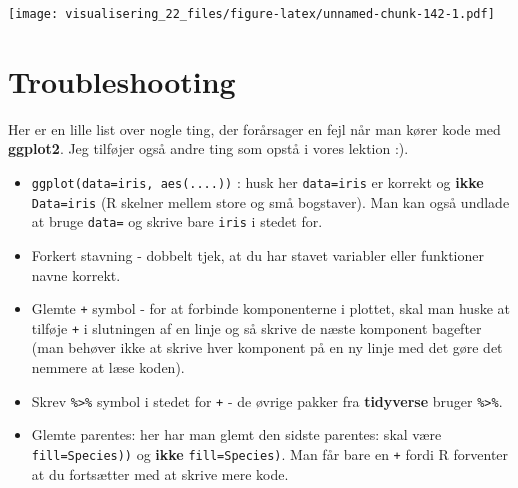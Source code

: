 \documentclass[
]{book}
\newenvironment{Shaded}{\begin{snugshade}}{\end{snugshade}}
\newcommand{\AttributeTok}[1]{\textcolor[rgb]{0.77,0.63,0.00}{#1}}
\newcommand{\DecValTok}[1]{\textcolor[rgb]{0.00,0.00,0.81}{#1}}
\newcommand{\FloatTok}[1]{\textcolor[rgb]{0.00,0.00,0.81}{#1}}
\newcommand{\FunctionTok}[1]{\textcolor[rgb]{0.00,0.00,0.00}{#1}}
\newcommand{\NormalTok}[1]{#1}
\newcommand{\OtherTok}[1]{\textcolor[rgb]{0.56,0.35,0.01}{#1}}
\newcommand{\SpecialCharTok}[1]{\textcolor[rgb]{0.00,0.00,0.00}{#1}}
\newcommand{\StringTok}[1]{\textcolor[rgb]{0.31,0.60,0.02}{#1}}
\begin{document}
\begin{Shaded}
\end{Shaded}

\texttt{[image: visualisering\_22\_files/figure-latex/unnamed-chunk-142-1.pdf]}

\hypertarget{troubleshooting}{%
\section{Troubleshooting}\label{troubleshooting}}

Her er en lille list over nogle ting, der forårsager en fejl når man kører kode med \textbf{ggplot2}. Jeg tilføjer også andre ting som opstå i vores lektion :).

\begin{itemize}
\item
  \texttt{ggplot(data=iris,\ aes(....))} : husk her \texttt{data=iris} er korrekt og \textbf{ikke} \texttt{Data=iris} (R skelner mellem store og små bogstaver). Man kan også undlade at bruge \texttt{data=} og skrive bare \texttt{iris} i stedet for.
\item
  Forkert stavning - dobbelt tjek, at du har stavet variabler eller funktioner navne korrekt.
\item
  Glemte \texttt{+} symbol - for at forbinde komponenterne i plottet, skal man huske at tilføje \texttt{+} i slutningen af en linje og så skrive de næste komponent bagefter (man behøver ikke at skrive hver komponent på en ny linje med det gøre det nemmere at læse koden).
\item
  Skrev \texttt{\%\textgreater{}\%} symbol i stedet for \texttt{+} - de øvrige pakker fra \textbf{tidyverse} bruger \texttt{\%\textgreater{}\%}.
\item
  Glemte parentes: her har man glemt den sidste parentes: skal være \texttt{fill=Species))} og \textbf{ikke} \texttt{fill=Species)}. Man får bare en \texttt{+} fordi R forventer at du fortsætter med at skrive mere kode.
\end{itemize}
\end{document}
